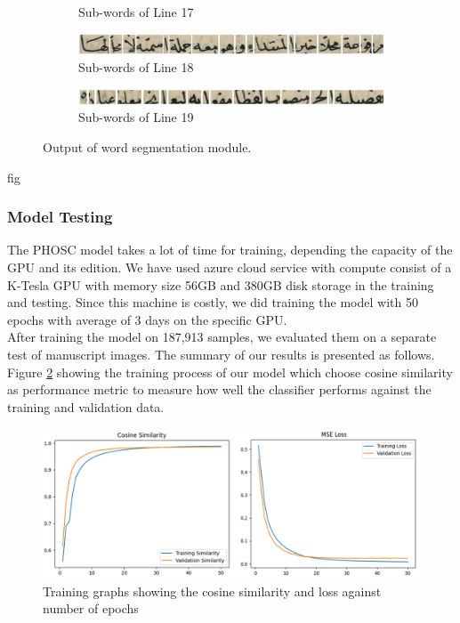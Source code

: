\begin{figure}[H]
\begin{subfigure}[b]{0.3\textwidth}
         \caption{Sub-words of Line 17}
     \end{subfigure}
     \centering%
     \begin{subfigure}[b]{0.3\textwidth}
         \centering
         \includegraphics[width=\textwidth]{images/word-seg/line-18.png}
         \caption{Sub-words of Line 18}
     \end{subfigure}
     \centering%
     \begin{subfigure}[b]{0.3\textwidth}
         \centering
         \includegraphics[width=\textwidth]{images/word-seg/line-19.png}
         \caption{Sub-words of Line 19}
     \end{subfigure}
    \caption{Output of word segmentation module.}
    \label{fig:line-segmentation-results}
\end{figure}
fig
\subsubsection{Model Testing}
The PHOSC model takes a lot of time for training, depending the capacity of the GPU and its edition. We have used azure cloud service with compute consist of a K-Tesla GPU with memory size 56GB and 380GB disk storage in the training and testing. Since this machine is costly, we did training the model with 50 epochs with average of 3 days on the specific GPU. \\

After training the model on 187,913 samples, we evaluated them on a separate test of manuscript images. The summary of our results is presented as follows. Figure \ref{fig:training-graphs} showing the training process of our model which choose cosine similarity as performance metric to measure how well the classifier performs against the training and validation data.

\begin{figure}[H]
    \centering
    \includegraphics[width=15cm]{images/training-graphs.png}
    \caption{Training graphs showing the cosine similarity and loss against number of epochs}
    \label{fig:training-graphs}
\end{figure}

